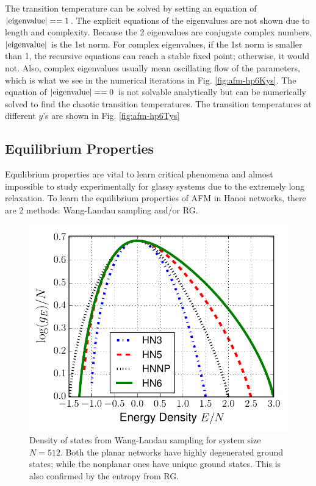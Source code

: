The transition temperature can be solved by setting an equation of $\rm |eigenvalue|==1$. The explicit equations of the eigenvalues are not shown due to length and complexity. Because the 2 eigenvalues are conjugate complex numbers, $\rm |eigenvalue|$ is the 1st norm. For complex eigenvalues, if the 1st norm is smaller than 1, the recursive equations can reach a stable fixed point; otherwise, it would not. Also, complex eigenvalues usually mean oscillating flow of the parameters, which is what we see in the numerical iterations in Fig. \ref{fig:afm-hp6Kys}.
The equation of $\rm |eigenvalue|==0$ is not solvable analytically but can be numerically solved to find the chaotic transition temperatures. The transition temperatures at different $y$'s are shown in Fig. \ref{fig:afm-hp6Tys}




\subsection{Equilibrium Properties}
\label{sec:afm-eqa}
Equilibrium properties are vital to learn critical phenomena and almost impossible to study experimentally for glassy systems due to the extremely long relaxation. To learn the equilibrium properties of AFM in Hanoi networks, there are 2 methods: Wang-Landau sampling and/or RG. 

\begin{figure}
\centering \includegraphics[width=0.6\columnwidth]{Chapter-3/HN35P6DOS_h3.pdf}
\protect\caption{Density of states from Wang-Landau sampling for system size $N=512$. Both the planar networks have highly degenerated ground states; while the nonplanar ones have unique ground states. This is also confirmed by the entropy from RG. }
\label{fig:afm-doswl} 
\end{figure}

